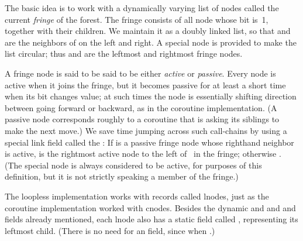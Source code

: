 The basic idea is to work with a dynamically varying list of nodes called
the current {\it fringe\/} of the forest. The fringe consists of all
node whose bit is~1, together with their children.
We maintain it as a doubly linked list,
so that  and  are
the neighbors of  on the left and right. A special node 
is
provided to make the list circular; thus  and 
are the leftmost and rightmost fringe nodes.

A fringe node is said to be said to be either {\it active\/} or {\it passive}.
Every node is active when it joins the fringe, but it becomes passive for at
least a short time when its bit changes value; at such times the node is
essentially shifting direction between going forward or backward, as
in the coroutine implementation. (A passive node corresponds roughly to
a coroutine that is asking its siblings to make the next move.)
We save time jumping across such call-chains by using a special link
field called the : If  is a passive fringe node whose
righthand
neighbor  is active,  is the
rightmost active
node to the left of~ in the fringe; otherwise . (The
special  node is always considered to be active, for purposes of
this definition, but it is not strictly speaking a member of the fringe.)

The loopless implementation works with records called lnodes, just as
the coroutine implementation worked with cnodes.
Besides the dynamic  and  and  and  fields
already mentioned, each lnode also has a static field called
, representing its leftmost child.
(There is no need for an  field, since  when
.)

